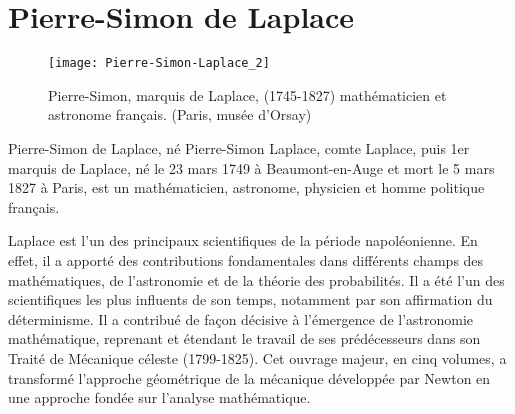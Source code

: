\chapter{Pierre-Simon de Laplace\label{annexe-lap_irl}}
\begin{figure}[!b]
    \centering
    \texttt{[image: Pierre-Simon-Laplace\_2]}
    \caption*{Pierre-Simon, marquis de Laplace,  (1745-1827) mathématicien 
             et astronome français. (Paris, musée d'Orsay)}
\end{figure}
\indent Pierre-Simon de Laplace, né Pierre-Simon Laplace, comte Laplace, puis 
1er marquis de Laplace, né le 23 mars 1749 à Beaumont-en-Auge et mort le 5 
mars 1827 à Paris, est un mathématicien, astronome, physicien et homme 
politique français.

Laplace est l'un des principaux scientifiques de la période napoléonienne. 
En effet, il a apporté des contributions fondamentales dans différents champs 
des mathématiques, de l'astronomie et de la théorie des probabilités. Il a 
été l'un des scientifiques les plus influents de son temps, notamment par son 
affirmation du déterminisme. Il a contribué de façon décisive à l'émergence 
de l'astronomie mathématique, reprenant et étendant le travail de ses 
prédécesseurs dans son Traité de Mécanique céleste (1799-1825). Cet ouvrage 
majeur, en cinq volumes, a transformé l'approche géométrique de la mécanique
développée par Newton en une approche fondée sur l'analyse mathématique.
